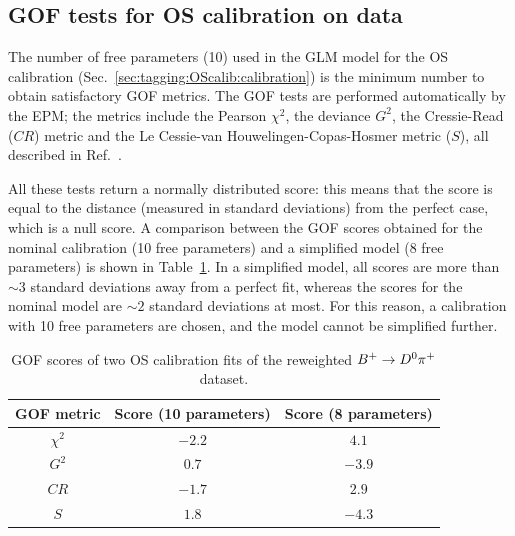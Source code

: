 \subsection[GOF tests for OS calibration on $\Bp\to\Dz\pip$ data]{GOF tests for OS calibration on \boldmath{$\Bp\to\Dz\pip$} data}
\label{app:chooseOSdegree}

The number of free parameters (10) used in the GLM model for the OS calibration (Sec.~\ref{sec:tagging:OScalib:calibration}) is the minimum number to 
obtain satisfactory GOF metrics. The GOF tests are performed automatically by the EPM; the metrics include the Pearson $\chi^2$, the deviance $G^2$, the Cressie-Read ($CR$) metric and the Le Cessie-van Houwelingen-Copas-Hosmer metric ($S$), all described in Ref.~\cite{EPM}.

All these tests return a normally distributed score: this means that the score is equal to the distance (measured in standard deviations) from the perfect case, which is a null score. A comparison between the GOF scores obtained for the nominal calibration (10 free parameters) and a simplified model (8 free parameters) is shown in Table~\ref{tab:gof_scores}. In a simplified model, all scores are more than $\sim 3$ standard deviations away from a perfect fit, whereas the scores for the nominal model are $\sim 2$ standard deviations at most. For this reason, a calibration with 10 free parameters are chosen, and the model cannot be simplified further. 

\begin{table}[htbp]
        \centering
        \caption{GOF scores of two OS calibration fits of the reweighted $\Bp\to\Dz\pip$ dataset.}
        \begin{tabular}{ccc}
                \toprule
                GOF metric & Score (10 parameters) & Score (8 parameters)\\
                \midrule
                $\chi^2$ & $-2.2$ & $4.1$ \\  
                $G^2$ & $0.7$ & $-3.9$ \\
                $CR$ & $-1.7$ & $2.9$ \\
                $S$ & $1.8$ & $-4.3$ \\
                \bottomrule
        \end{tabular}
        \label{tab:gof_scores}
\end{table}
